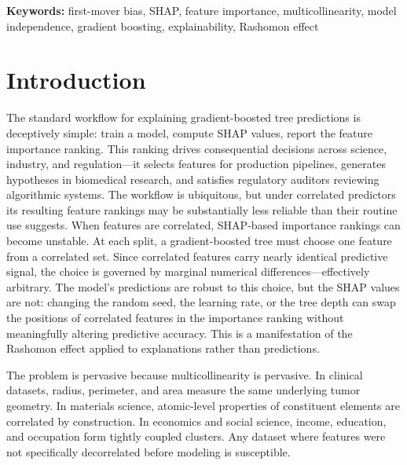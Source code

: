 \documentclass[10pt]{article}
\begin{document}
\smallskip
\noindent\textbf{Keywords:} first-mover bias, SHAP, feature importance,
multicollinearity, model independence, gradient boosting, explainability,
Rashomon effect


\section{Introduction}
\label{sec:introduction}

The standard workflow for explaining gradient-boosted tree predictions is
deceptively simple: train a model, compute SHAP values, report the feature
importance ranking. This ranking drives consequential decisions across
science, industry, and regulation---it selects features for production
pipelines, generates hypotheses in biomedical research, and satisfies
regulatory auditors reviewing algorithmic systems. The workflow is
ubiquitous, but under correlated predictors its resulting feature rankings may be
substantially less reliable than their routine use suggests. When features are correlated, SHAP-based importance rankings
can become unstable. At each split, a gradient-boosted tree must choose one
feature from a correlated set. Since correlated features carry nearly
identical predictive signal, the choice is governed by marginal numerical
differences---effectively arbitrary. The model's predictions are robust to
this choice, but the SHAP values are not: changing the random seed, the
learning rate, or the tree depth can swap the positions of correlated
features in the importance ranking without meaningfully altering predictive
accuracy. This is a manifestation of the Rashomon effect
\citep{breiman2001statistical} applied to explanations rather than
predictions.

The problem is pervasive because multicollinearity is pervasive. In
clinical datasets, radius, perimeter, and area measure the same underlying
tumor geometry. In materials science, atomic-level properties of
constituent elements are correlated by construction. In economics and
social science, income, education, and occupation form tightly coupled
clusters. Any dataset where features were not specifically decorrelated
before modeling is susceptible.
\end{document}
